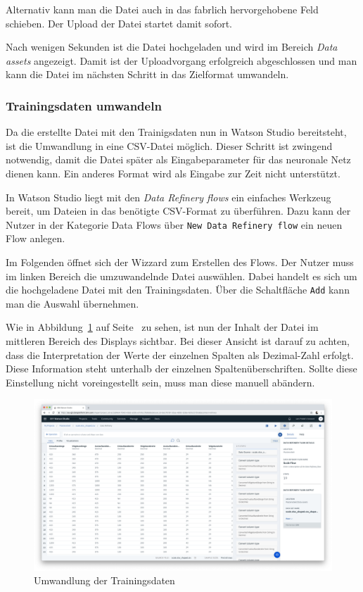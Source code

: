 Alternativ kann man die Datei auch in das fabrlich hervorgehobene Feld schieben. Der Upload der Datei startet damit
sofort.

Nach wenigen Sekunden ist die Datei hochgeladen und wird im Bereich \textit{Data assets} angezeigt. Damit ist der
Uploadvorgang erfolgreich abgeschlossen und man kann die Datei im nächsten Schritt in das Zielformat umwandeln.

\subsubsection{Trainingsdaten umwandeln}
Da die erstellte Datei mit den Trainigsdaten nun in Watson Studio bereitsteht, ist die Umwandlung in eine CSV-Datei
möglich. Dieser Schritt ist zwingend notwendig, damit die Datei später als Eingabeparameter für das neuronale Netz
dienen kann. Ein anderes Format wird als Eingabe zur Zeit nicht unterstützt.

In Watson Studio liegt mit den \textit{Data Refinery flows} ein einfaches Werkzeug bereit, um Dateien in das benötigte
CSV-Format zu überführen. Dazu kann der Nutzer in der Kategorie Data Flows über \texttt{New Data Refinery flow} ein
neuen Flow anlegen.

Im Folgenden öffnet sich der Wizzard zum Erstellen des Flows. Der Nutzer muss im linken Bereich die umzuwandelnde Datei
auswählen. Dabei handelt es sich um die hochgeladene Datei mit den Trainingsdaten. Über die Schaltfläche \texttt{Add}
kann man die Auswahl übernehmen.

Wie in Abbildung~\ref{fig:umsetzung_data_flow} auf Seite~\pageref{fig:umsetzung_data_flow} zu sehen, ist nun der Inhalt
der Datei im mittleren Bereich des Displays sichtbar. Bei dieser Ansicht ist darauf zu achten, dass die Interpretation
der Werte der einzelnen Spalten als Dezimal-Zahl erfolgt. Diese Information steht unterhalb der einzelnen
Spaltenüberschriften. Sollte diese Einstellung nicht voreingestellt sein, muss man diese manuell abändern.

\begin{figure}[h]
    \centering
    \includegraphics[width=\textwidth]{images/kapitel_3/umsetzung_data_flow.png}
    \caption{Umwandlung der Trainingsdaten}
    \label{fig:umsetzung_data_flow}
\end{figure}

